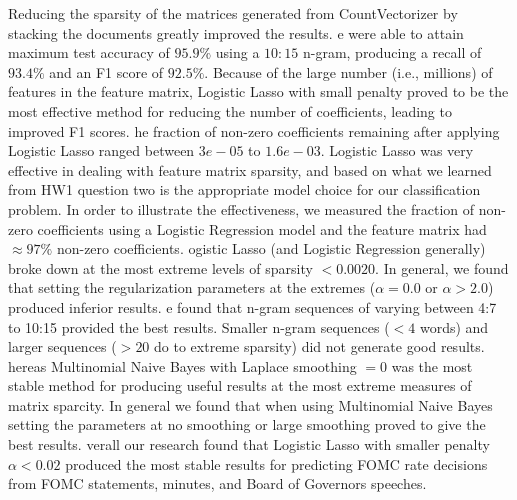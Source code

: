\documentclass[11pt]{article}
\newcommand{\vertSpace}[1]{\vspace{3mm}}
\begin{document}
{\vertSpace

\section{Conclusion}
Reducing the sparsity of the matrices generated from CountVectorizer by stacking the documents greatly improved the results.  \vertSpace


We were able to attain maximum test accuracy of $95.9\%$ using a $10:15$ n-gram, producing a recall of $93.4\%$ and an F1 score of $92.5\%$.  Because of the large number (i.e., millions) of features in the feature matrix, Logistic Lasso with small penalty proved to be the most effective method for reducing the number of coefficients, leading to improved F1 scores.  \vertSpace


The fraction of non-zero coefficients remaining after applying Logistic Lasso ranged between $3e-05$ to $1.6e-03$.  Logistic Lasso was very effective in dealing with feature matrix sparsity, and based on what we learned from HW1 question two is the appropriate model choice for our classification problem.  In order to illustrate the effectiveness, we measured the fraction of non-zero coefficients using a Logistic Regression model and the feature matrix had $\approx 97\%$ non-zero coefficients.  \vertSpace 


Logistic Lasso (and Logistic Regression generally) broke down at the most extreme levels of sparsity $<0.0020$.  In general, we found that setting the regularization parameters at the extremes ($\alpha=0.0$ or $\alpha > 2.0$) produced inferior results.  \vertSpace

 

We found that n-gram sequences of varying between 4:7 to 10:15 provided the best results. Smaller n-gram sequences ($< 4$ words) and larger sequences ($>20$ do to extreme sparsity) did not generate good results.  \vertSpace


Whereas Multinomial Naive Bayes with Laplace smoothing $=0$ was the most stable method for producing useful results at the most extreme measures of matrix sparcity.  In general we found that when using Multinomial Naive Bayes setting the parameters at no smoothing or large smoothing proved to give the best results. \vertSpace  


Overall our research found that Logistic Lasso with smaller penalty $\alpha < 0.02$ produced the most stable results for predicting FOMC rate decisions from FOMC statements, minutes, and Board of Governors speeches.\vertSpace


}
\end{document}
